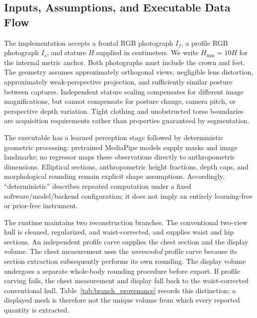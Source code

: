 \documentclass[journal]{IEEEtran}
\begin{document}
\subsection{Inputs, Assumptions, and Executable Data Flow}
The implementation accepts a frontal RGB photograph $I_f$, a profile RGB photograph $I_s$, and stature $H$ supplied in centimeters. We write $H_{\mathrm{mm}}=10H$ for the internal metric anchor. Both photographs must include the crown and feet. The geometry assumes approximately orthogonal views, negligible lens distortion, approximately weak-perspective projection, and sufficiently similar posture between captures. Independent stature scaling compensates for different image magnifications, but cannot compensate for posture change, camera pitch, or perspective depth variation. Tight clothing and unobstructed torso boundaries are acquisition requirements rather than properties guaranteed by segmentation.

The executable has a learned perception stage followed by deterministic geometric processing: pretrained MediaPipe models supply masks and image landmarks; no regressor maps these observations directly to anthropometric dimensions. Elliptical sections, anthropometric height fractions, depth caps, and morphological rounding remain explicit shape assumptions. Accordingly, ``deterministic'' describes repeated computation under a fixed software/model/backend configuration; it does not imply an entirely learning-free or prior-free instrument.

The runtime maintains two reconstruction branches. The conventional two-view hull is cleaned, regularized, and waist-corrected, and supplies waist and hip sections. An independent profile carve supplies the chest section and the display volume. The chest measurement uses the \emph{unrounded} profile carve because its section extraction subsequently performs its own rounding. The display volume undergoes a separate whole-body rounding procedure before export. If profile carving fails, the chest measurement and display fall back to the waist-corrected conventional hull. Table~\ref{tab:branch_provenance} records this distinction; a displayed mesh is therefore not the unique volume from which every reported quantity is extracted.
\end{document}
